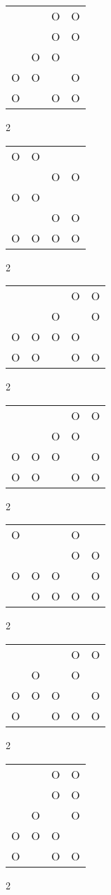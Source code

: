 \begin{tabular}{|m{0.2cm}m{0.2cm}m{0.2cm}m{0.2cm}|}\hline
 & &O&O\\
 & &O&O\\
 &O&O& \\
O&O& &O\\
O& &O&O\\
\hline\end{tabular}2
\begin{tabular}{|m{0.2cm}m{0.2cm}m{0.2cm}m{0.2cm}|}\hline
O&O& & \\
 & &O&O\\
O&O& & \\
 & &O&O\\
O&O&O&O\\
\hline\end{tabular}2
\begin{tabular}{|m{0.2cm}m{0.2cm}m{0.2cm}m{0.2cm}m{0.2cm}|}\hline
 & & &O&O\\
 & &O& &O\\
O&O&O&O& \\
O&O& &O&O\\
\hline\end{tabular}2
\begin{tabular}{|m{0.2cm}m{0.2cm}m{0.2cm}m{0.2cm}m{0.2cm}|}\hline
 & & &O&O\\
 & &O&O& \\
O&O&O& &O\\
O&O& &O&O\\
\hline\end{tabular}2
\begin{tabular}{|m{0.2cm}m{0.2cm}m{0.2cm}m{0.2cm}m{0.2cm}|}\hline
O& & &O& \\
 & & &O&O\\
O&O&O& &O\\
 &O&O&O&O\\
\hline\end{tabular}2
\begin{tabular}{|m{0.2cm}m{0.2cm}m{0.2cm}m{0.2cm}m{0.2cm}|}\hline
 & & &O&O\\
 &O& &O& \\
O&O&O& &O\\
O& &O&O&O\\
\hline\end{tabular}2
\begin{tabular}{|m{0.2cm}m{0.2cm}m{0.2cm}m{0.2cm}|}\hline
 & &O&O\\
 & &O&O\\
 &O& &O\\
O&O&O& \\
O& &O&O\\
\hline\end{tabular}2
